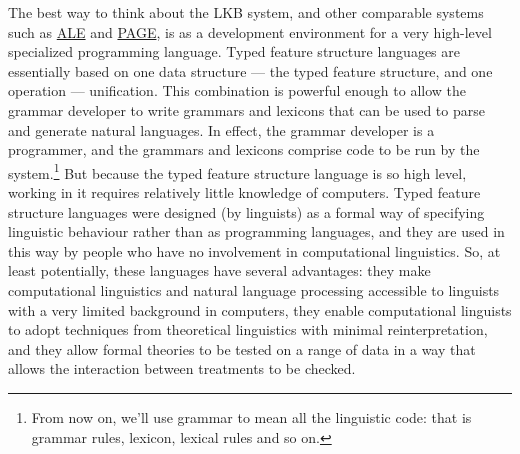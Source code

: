 \documentclass[12pt]{report}
\begin{document}
The best way to think about the LKB system, and other comparable systems such
as \href{http://www.sfs.nphil.uni-tuebingen.de/~gpenn/ale.html}{ALE} 
and \href{http://www.dfki.de/lt/systems/page/page.html}{PAGE}, 
is as a development environment for a very high-level
specialized programming language.  Typed feature structure
languages are essentially based on one data structure --- the typed feature
structure, and one operation --- unification.  This combination is powerful
enough to allow the grammar developer to write grammars and lexicons that can
be used to parse and generate natural languages.  In effect, the grammar
developer is a programmer, and the grammars and lexicons 
comprise code to be run by
the system.\footnote{From now on, we'll use grammar to mean
all the linguistic code: that is grammar rules, lexicon, lexical rules 
and so on.}  
But because the typed feature structure language 
is so high level, working in it requires relatively little knowledge
of computers.  Typed feature structure languages were designed
(by linguists) as a formal way of specifying linguistic
behaviour rather than as programming languages, and they are used
in this way by people who have no involvement in computational 
linguistics.  So, at least potentially, these languages have several
advantages: they make computational
linguistics and natural language processing accessible to linguists
with a very limited background in computers, they enable computational 
linguists to adopt techniques from theoretical linguistics with minimal 
reinterpretation, and they allow formal theories to be tested on
a range of data in a way that allows the interaction between
treatments to be checked.
\end{document}
